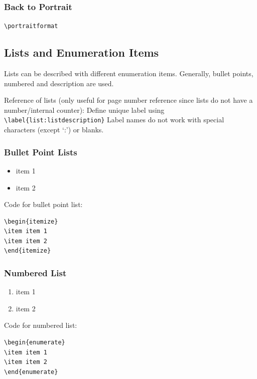 \documentclass{pharmrep}
\begin{document}
\portraitformat
\subsubsection{Back to Portrait}
\verb|\portraitformat|

\blindtext

\subsection{Lists and Enumeration Items}
Lists can be described with different enumeration items. Generally, bullet points, numbered and
description are used.

Reference of lists (only useful for page number reference since lists do not have a number/internal
counter):
Define unique label using\newline
\verb|\label{list:listdescription}| \newline
Label names do not work with special characters (except `:') or blanks.

\subsubsection{Bullet Point Lists}
\begin{itemize}
\item item 1
\item item 2
\end{itemize}

Code for bullet point list:
\begin{verbatim}
\begin{itemize}
\item item 1
\item item 2
\end{itemize}
\end{verbatim}

\subsubsection{Numbered List}
\begin{enumerate}
\item item 1
\item item 2
\end{enumerate}

Code for numbered list:
\begin{verbatim}
\begin{enumerate}
\item item 1
\item item 2
\end{enumerate}
\end{verbatim}
\end{document}
